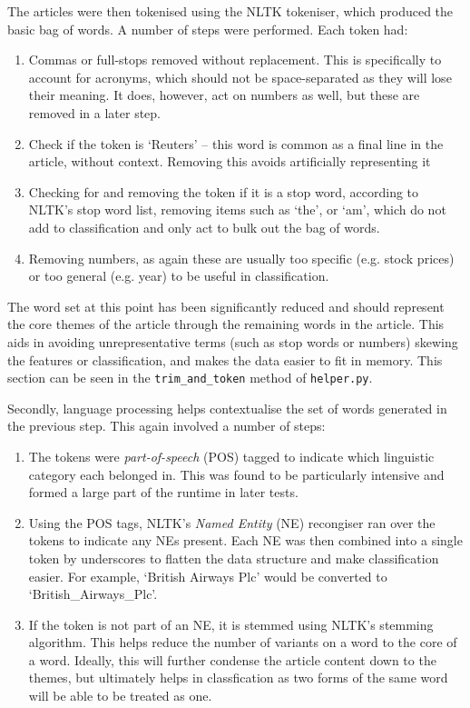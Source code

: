 \documentclass[11pt]{article}
\begin{document}
The articles were then tokenised using the NLTK tokeniser, which produced the basic bag of words. A number of steps were performed. Each token had:
\begin{enumerate}
\item Commas or full-stops removed without replacement. This is specifically to account for acronyms, which should not be space-separated as they will lose their meaning. It does, however, act on numbers as well, but these are removed in a later step.
\item Check if the token is `Reuters' – this word is common as a final line in the article, without context. Removing this avoids artificially representing it
\item Checking for and removing the token if it is a stop word, according to NLTK’s stop word list, removing items such as `the', or `am', which do not add to classification and only act to bulk out the bag of words.
\item Removing numbers, as again these are usually too specific (e.g. stock prices) or too general (e.g. year) to be useful in classification.
\end{enumerate}

The word set at this point has been significantly reduced and should represent the core themes of the article through the remaining words in the article. This aids in avoiding unrepresentative terms (such as stop words or numbers) skewing the features or classification, and makes the data easier to fit in memory. This section can be seen in the \texttt{trim\_and\_token} method of \texttt{helper.py}.

Secondly, language processing helps contextualise the set of words generated in the previous step. This again involved a number of steps:
\begin{enumerate}
\item The tokens were \textit{part-of-speech} (POS) tagged to indicate which linguistic category each belonged in. This was found to be particularly intensive and formed a large part of the runtime in later tests.
\item Using the POS tags, NLTK's \textit{Named Entity} (NE) recongiser ran over the tokens to indicate any NEs present. Each NE was then combined into a single token by underscores to flatten the data structure and make classification easier. For example, `British Airways Plc' would be converted to `British\_Airways\_Plc'.
\item If the token is not part of an NE, it is stemmed using NLTK's stemming algorithm. This helps reduce the number of variants on a word to the core of a word. Ideally, this will further condense the article content down to the themes, but ultimately helps in classfication as two forms of the same word will be able to be treated as one.
\end{enumerate}
\end{document}
